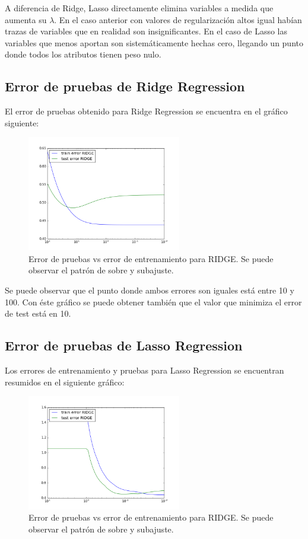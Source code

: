 \documentclass[letter, 10pt]{article}
\begin{document}
A diferencia de Ridge, Lasso directamente elimina variables a medida que aumenta
su $\lambda$. En el caso anterior con valores de regularización altos igual
habían trazas de variables que en realidad son insignificantes. En el caso de
Lasso las variables que menos aportan son sistemáticamente hechas cero, llegando
un punto donde todos los atributos tienen peso nulo.

\subsection{Error de pruebas de Ridge Regression}
El error de pruebas obtenido para Ridge Regression se encuentra en el gráfico
siguiente:

\begin{figure}[H]
  \centering
  \includegraphics[width=0.6\textwidth]{Images/p3_fig3.png} 
  \caption{Error de pruebas vs error de entrenamiento para RIDGE. Se puede
    observar el patrón de sobre y subajuste.}
  \label{fig:p3_g2}
\end{figure}

Se puede observar que el punto donde ambos errores son iguales está entre 10 y
100. Con éste gráfico se puede obtener también que el valor que minimiza el error de
test está en 10. 
\subsection{Error de pruebas de Lasso Regression}
Los errores de entrenamiento y pruebas para Lasso Regression se encuentran
resumidos en el siguiente gráfico:

\begin{figure}[H]
  \centering
  \includegraphics[width=0.6\textwidth]{Images/p3_fig4.png} 
  \caption{Error de pruebas vs error de entrenamiento para RIDGE. Se puede
    observar el patrón de sobre y subajuste.}
  \label{fig:p3_g2}
\end{figure}
\end{document}
